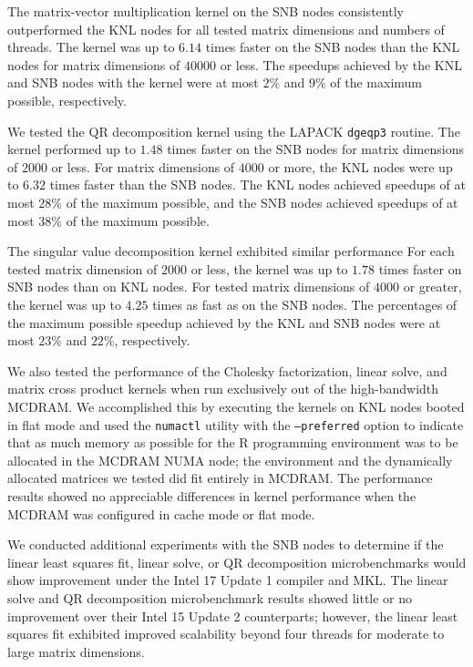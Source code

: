 The matrix-vector multiplication kernel on the SNB nodes consistently
  outperformed the KNL nodes for all tested matrix dimensions and numbers of
  threads.
The kernel was up to $6.14$ times faster on the SNB nodes than the KNL nodes for
  matrix dimensions of $40000$ or less.
The speedups achieved by the KNL and SNB nodes with the kernel were at most
  $2\%$ and $9\%$ of the maximum possible, respectively.

We tested the QR decomposition kernel using the LAPACK \texttt{dgeqp3}
  routine.
The kernel performed up to $1.48$ times faster on the SNB nodes for
  matrix dimensions of $2000$ or less.
For matrix dimensions of $4000$ or more, the KNL nodes were up to
  $6.32$ times faster than the SNB nodes.
The KNL nodes achieved speedups of at most $28\%$ of the maximum possible, and
  the SNB nodes achieved speedups of at most $38\%$ of the maximum possible.

The singular value decomposition kernel exhibited similar performance
For each tested matrix dimension of $2000$ or less, the kernel was
  up to $1.78$ times faster on SNB nodes than on KNL nodes.
For tested matrix dimensions of $4000$ or greater, the kernel was up to $4.25$
  times as fast as on the SNB nodes.
The percentages of the maximum possible speedup achieved by the KNL
  and SNB nodes were at most $23\%$ and $22\%$, respectively.

We also tested the performance of the Cholesky factorization, linear
  solve, and matrix cross product kernels when run exclusively out of the
  high-bandwidth MCDRAM.
We accomplished this by executing the kernels on KNL nodes booted in
  flat mode and used the \texttt{numactl} utility with the \texttt{--preferred}
  option to indicate that as much memory as possible for the R programming
  environment was to be allocated in the MCDRAM NUMA node; the environment and
  the dynamically allocated matrices we tested did fit entirely in MCDRAM.
The performance results showed no appreciable differences
  in kernel performance when the MCDRAM was configured in cache mode or flat
  mode.

We conducted additional experiments with the SNB nodes to determine if
  the linear least squares fit, linear solve, or QR decomposition microbenchmarks
  would show improvement under the Intel 17 Update 1 compiler and MKL.
The linear solve and QR decomposition microbenchmark results showed little
  or no improvement over their Intel 15 Update 2 counterparts; however, the
  linear least squares fit exhibited improved scalability beyond four threads
  for moderate to large matrix dimensions.

